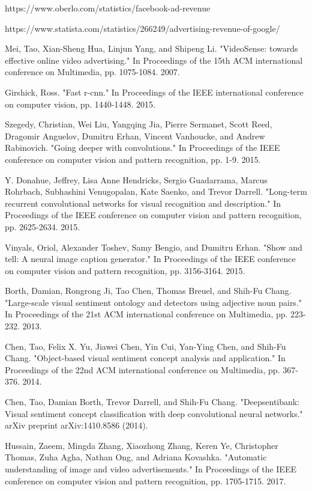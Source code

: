 \documentclass[conference]{IEEEtran}
\begin{document}
\begin{thebibliography}{00}
 https://www.oberlo.com/statistics/facebook-ad-revenue

 https://www.statista.com/statistics/266249/advertising-revenue-of-google/

 Mei, Tao, Xian-Sheng Hua, Linjun Yang, and Shipeng Li. "VideoSense: towards effective online video advertising." In Proceedings of the 15th ACM international conference on Multimedia, pp. 1075-1084. 2007.

 Girshick, Ross. "Fast r-cnn." In Proceedings of the IEEE international conference on computer vision, pp. 1440-1448. 2015.

 Szegedy, Christian, Wei Liu, Yangqing Jia, Pierre Sermanet, Scott Reed, Dragomir Anguelov, Dumitru Erhan, Vincent Vanhoucke, and Andrew Rabinovich. "Going deeper with convolutions." In Proceedings of the IEEE conference on computer vision and pattern recognition, pp. 1-9. 2015.

 Y. Donahue, Jeffrey, Lisa Anne Hendricks, Sergio Guadarrama, Marcus Rohrbach, Subhashini Venugopalan, Kate Saenko, and Trevor Darrell. "Long-term recurrent convolutional networks for visual recognition and description." In Proceedings of the IEEE conference on computer vision and pattern recognition, pp. 2625-2634. 2015.

 Vinyals, Oriol, Alexander Toshev, Samy Bengio, and Dumitru Erhan. "Show and tell: A neural image caption generator." In Proceedings of the IEEE conference on computer vision and pattern recognition, pp. 3156-3164. 2015.

 Borth, Damian, Rongrong Ji, Tao Chen, Thomas Breuel, and Shih-Fu Chang. "Large-scale visual sentiment ontology and detectors using adjective noun pairs." In Proceedings of the 21st ACM international conference on Multimedia, pp. 223-232. 2013.

 Chen, Tao, Felix X. Yu, Jiawei Chen, Yin Cui, Yan-Ying Chen, and Shih-Fu Chang. "Object-based visual sentiment concept analysis and application." In Proceedings of the 22nd ACM international conference on Multimedia, pp. 367-376. 2014.

 Chen, Tao, Damian Borth, Trevor Darrell, and Shih-Fu Chang. "Deepsentibank: Visual sentiment concept classification with deep convolutional neural networks." arXiv preprint arXiv:1410.8586 (2014).

 Hussain, Zaeem, Mingda Zhang, Xiaozhong Zhang, Keren Ye, Christopher Thomas, Zuha Agha, Nathan Ong, and Adriana Kovashka. "Automatic understanding of image and video advertisements." In Proceedings of the IEEE conference on computer vision and pattern recognition, pp. 1705-1715. 2017.


\end{thebibliography}
\end{document}
